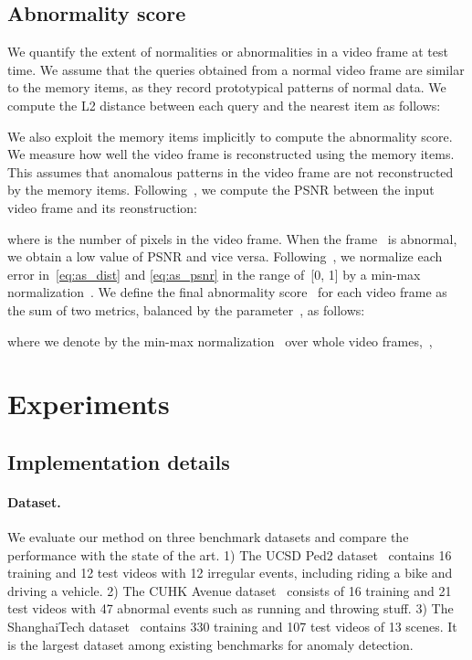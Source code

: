 \documentclass[10pt,twocolumn,letterpaper]{article}
\begin{document}
		
	
\vspace{-0.1cm}
	\subsection{Abnormality score}\label{sec:score}
\vspace{-0.1cm}
		We quantify the extent of normalities or abnormalities in a video frame at test time. We assume that the queries obtained from a normal video frame are similar to the memory items, as they record prototypical patterns of normal data. We compute the L2 distance between each query and the nearest item as follows:
		

		We also exploit the memory items implicitly to compute the abnormality score. We measure how well the video frame is reconstructed using the memory items. This assumes that anomalous patterns in the video frame are not reconstructed by the memory items. Following~\cite{liu2018future}, we compute the PSNR between the input video frame and its reonstruction:
		
		where  is the number of pixels in the video frame. When the frame~ is abnormal, we obtain a low value of PSNR and vice versa. Following~\cite{liu2018future,gong2019memorizing,luo2017revisit}, we normalize each error in~\eqref{eq:as_dist} and \eqref{eq:as_psnr} in the range of~[0, 1] by a min-max normalization~\cite{liu2018future}. We define the final abnormality score~ for each video frame as the sum of two metrics, balanced by the parameter~, as follows:
		
		where we denote by  the min-max normalization~\cite{liu2018future} over whole video frames,~\eg,
			



\vspace{-0.2cm}        
\section{Experiments}
\vspace{-0.1cm}    
	\subsection{Implementation details}
\vspace{-0.1cm}    
		\paragraph{Dataset.}
			We evaluate our method on three benchmark datasets and compare the performance with the state of the art. 1) The UCSD Ped2 dataset~\cite{li2013anomaly} contains 16 training and 12 test videos with 12 irregular events, including riding a bike and driving a vehicle. 2) The CUHK Avenue dataset~\cite{lu2013abnormal} consists of 16 training and 21 test videos with 47 abnormal events such as running and throwing stuff. 3) The ShanghaiTech dataset~\cite{luo2017revisit} contains 330 training and 107 test videos of 13 scenes. It is the largest dataset among existing benchmarks for anomaly detection. 
		
\end{document}
